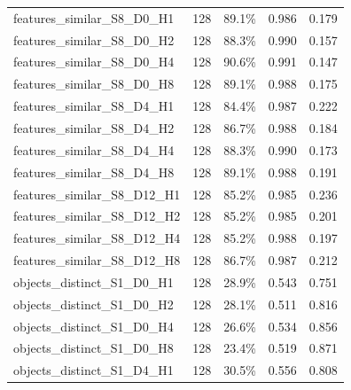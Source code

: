 \documentclass[11pt]{article}
\begin{document}
\begin{longtable}{p{}rrrr}
features\_\allowbreak{}similar\_\allowbreak{}S8\_\allowbreak{}D0\_\allowbreak{}H1 & 128 & 89.1\% & 0.986 & 0.179\\
features\_\allowbreak{}similar\_\allowbreak{}S8\_\allowbreak{}D0\_\allowbreak{}H2 & 128 & 88.3\% & 0.990 & 0.157\\
features\_\allowbreak{}similar\_\allowbreak{}S8\_\allowbreak{}D0\_\allowbreak{}H4 & 128 & 90.6\% & 0.991 & 0.147\\
features\_\allowbreak{}similar\_\allowbreak{}S8\_\allowbreak{}D0\_\allowbreak{}H8 & 128 & 89.1\% & 0.988 & 0.175\\
features\_\allowbreak{}similar\_\allowbreak{}S8\_\allowbreak{}D4\_\allowbreak{}H1 & 128 & 84.4\% & 0.987 & 0.222\\
features\_\allowbreak{}similar\_\allowbreak{}S8\_\allowbreak{}D4\_\allowbreak{}H2 & 128 & 86.7\% & 0.988 & 0.184\\
features\_\allowbreak{}similar\_\allowbreak{}S8\_\allowbreak{}D4\_\allowbreak{}H4 & 128 & 88.3\% & 0.990 & 0.173\\
features\_\allowbreak{}similar\_\allowbreak{}S8\_\allowbreak{}D4\_\allowbreak{}H8 & 128 & 89.1\% & 0.988 & 0.191\\
features\_\allowbreak{}similar\_\allowbreak{}S8\_\allowbreak{}D12\_\allowbreak{}H1 & 128 & 85.2\% & 0.985 & 0.236\\
features\_\allowbreak{}similar\_\allowbreak{}S8\_\allowbreak{}D12\_\allowbreak{}H2 & 128 & 85.2\% & 0.985 & 0.201\\
features\_\allowbreak{}similar\_\allowbreak{}S8\_\allowbreak{}D12\_\allowbreak{}H4 & 128 & 85.2\% & 0.988 & 0.197\\
features\_\allowbreak{}similar\_\allowbreak{}S8\_\allowbreak{}D12\_\allowbreak{}H8 & 128 & 86.7\% & 0.987 & 0.212\\
objects\_\allowbreak{}distinct\_\allowbreak{}S1\_\allowbreak{}D0\_\allowbreak{}H1 & 128 & 28.9\% & 0.543 & 0.751\\
objects\_\allowbreak{}distinct\_\allowbreak{}S1\_\allowbreak{}D0\_\allowbreak{}H2 & 128 & 28.1\% & 0.511 & 0.816\\
objects\_\allowbreak{}distinct\_\allowbreak{}S1\_\allowbreak{}D0\_\allowbreak{}H4 & 128 & 26.6\% & 0.534 & 0.856\\
objects\_\allowbreak{}distinct\_\allowbreak{}S1\_\allowbreak{}D0\_\allowbreak{}H8 & 128 & 23.4\% & 0.519 & 0.871\\
objects\_\allowbreak{}distinct\_\allowbreak{}S1\_\allowbreak{}D4\_\allowbreak{}H1 & 128 & 30.5\% & 0.556 & 0.808\\

\end{longtable}
\end{document}

